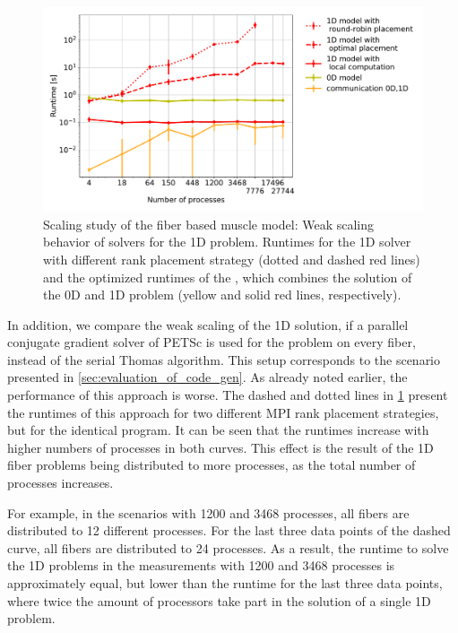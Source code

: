\begin{figure}
  \centering%
  \includegraphics[width=\textwidth]{images/results/studies/Comparisonof0D-1Dcomputationschemes.pdf}%
  \caption{Scaling study of the fiber based muscle model: Weak scaling behavior of solvers for the 1D problem. Runtimes for the 1D solver with different rank placement strategy (dotted and dashed red lines) and the optimized runtimes of the , which combines the solution of the 0D and 1D problem (yellow and solid red lines, respectively).}%
   \label{fig:hazel_hen_rank_placement}%
\end{figure}

In addition, we compare the weak scaling of the 1D solution, if a parallel conjugate gradient solver of PETSc is used for the problem on every fiber, instead of the serial Thomas algorithm. This setup corresponds to the  scenario presented in \cref{sec:evaluation_of_code_gen}. As already noted earlier, the performance of this approach is worse. The dashed and dotted lines in \cref{fig:hazel_hen_rank_placement} present the runtimes of this approach for two different MPI rank placement strategies, but for the identical program. It can be seen that the runtimes increase with higher numbers of processes in both curves. This effect is the result of the 1D fiber problems being distributed to more processes, as the total number of processes increases. 

For example, in the scenarios with 1200 and 3468 processes, all fibers are distributed to 12 different processes. For the last three data points of the dashed curve, all fibers are distributed to 24 processes. As a result, the runtime to solve the 1D problems in the measurements with 1200 and 3468 processes is approximately equal, but lower than the runtime for the last three data points, where twice the amount of processors take part in the solution of a single 1D problem.

